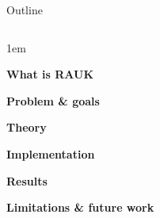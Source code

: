 \begin{frame}{Outline}
    \begin{columns}
        \begin{itemize-size}{1em} 
            \item \textbf{What is RAUK}
            \item \textbf{Problem \& goals}
            \item \textbf{Theory}
            \item \textbf{Implementation}
            \item \textbf{Results}
            \item \textbf{Limitations \& future work}
        \end{itemize-size}
        
    \end{columns}
\end{frame}

